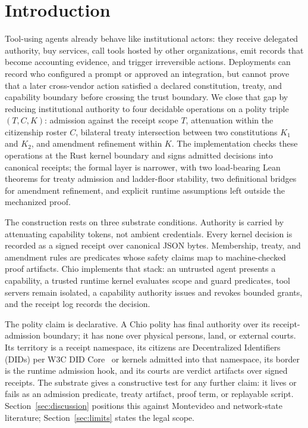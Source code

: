 \section{Introduction}

Tool-using agents already behave like institutional actors: they receive delegated authority, buy services, call tools hosted by other organizations, emit records that become accounting evidence, and trigger irreversible actions. Deployments can record who configured a prompt or approved an integration, but cannot prove that a later cross-vendor action satisfied a declared constitution, treaty, and capability boundary before crossing the trust boundary. We close that gap by reducing institutional authority to four decidable operations on a polity triple $(T, C, K)$: admission against the receipt scope $T$, attenuation within the citizenship roster $C$, bilateral treaty intersection between two constitutions $K_1$ and $K_2$, and amendment refinement within $K$. The implementation checks these operations at the Rust kernel boundary and signs admitted decisions into canonical receipts; the formal layer is narrower, with two load-bearing Lean theorems for treaty admission and ladder-floor stability, two definitional bridges for amendment refinement, and explicit runtime assumptions left outside the mechanized proof.

The construction rests on three substrate conditions. Authority is carried by attenuating capability tokens, not ambient credentials. Every kernel decision is recorded as a signed receipt over canonical JSON bytes. Membership, treaty, and amendment rules are predicates whose safety claims map to machine-checked proof artifacts. Chio implements that stack: an untrusted agent presents a capability, a trusted runtime kernel evaluates scope and guard predicates, tool servers remain isolated, a capability authority issues and revokes bounded grants, and the receipt log records the decision.

The polity claim is declarative. A Chio polity has final authority over its receipt-admission boundary; it has none over physical persons, land, or external courts. Its territory is a receipt namespace, its citizens are Decentralized Identifiers (DIDs) per W3C DID Core~\cite{w3cDidCore} or kernels admitted into that namespace, its border is the runtime admission hook, and its courts are verdict artifacts over signed receipts. The substrate gives a constructive test for any further claim: it lives or fails as an admission predicate, treaty artifact, proof term, or replayable script. Section~\ref{sec:discussion} positions this against Montevideo and network-state literature; Section~\ref{sec:limits} states the legal scope.

